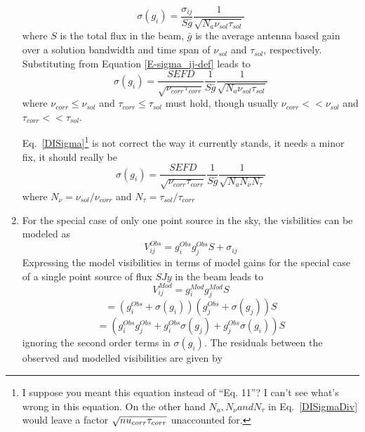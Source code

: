 \documentclass[11pt]{article}
\begin{document}
\begin{enumerate}
\begin{equation}
\sigma(g_i) = \frac {\sigma_{ij}} {S \bar{g}} \frac {1} {\sqrt{N_a \nu_{sol} \tau_{sol}}}
\end{equation}
where $S$ is the total flux in the beam, $\bar{g}$ is the average antenna based gain over a solution bandwidth and time span of $\nu_{sol}$ and $\tau_{sol}$, respectively.
Substituting from Equation \ref{E-sigma_ij-def} leads to
\begin{equation}
\sigma(g_i) = \frac {SEFD} {\sqrt{\nu_{corr} \tau_{corr}}} \frac {1} {S \bar{g}} \frac {1} {\sqrt{N_a \nu_{sol} \tau_{sol}}}
\end{equation}
where $\nu_{corr} \le \nu_{sol}$ and $\tau_{corr} \le \tau_{sol}$ must hold, though usually $\nu_{corr} << \nu_{sol}$ and $\tau_{corr} << \tau_{sol}$.

Eq.~\ref{DISigma}\footnote{I suppose you meant this equation instead
  of ``Eq. 11''?  I can't see what's wrong in this equation.  On the
  other hand $N_a, N_\nu and N_\tau$ in Eq.~\ref{DISigmaDiv} would
  leave a factor $\sqrt{\\nu_{corr}\tau_{corr}}$ unaccounted for.} is not correct the way it currently stands, it needs a minor fix, it should really be
\begin{equation}
\label{DISigmaDiv}
\sigma(g_i) = \frac {SEFD} {\sqrt{\nu_{corr} \tau_{corr}}} \frac {1} {S \bar{g}} \frac {1} {\sqrt{N_a N_{\nu} N_{\tau}}}
\end{equation}
where $N_{\nu} = \nu_{sol}/\nu_{corr}$ and $N_{\tau} = \tau_{sol}/\tau_{corr}$ 
\item 
For the special case of only one point source in the sky, the visbilities can be modeled as
\begin{equation}
V_{ij}^{Obs} = g_i^{Obs} g_j^{Obs} S + \sigma_{ij}
\end{equation}
Expressing the model visibilities in terms of model gains for the special case of a single point source of flux $S Jy$ in the beam leads to
\begin{equation}
V_{ij}^{Mod} = g_i^{Mod} g_j^{Mod} S 
\end{equation}
\begin{equation}
= (g_i^{Obs} + \sigma(g_i)) (g_j^{Obs} + \sigma(g_j)) S
\end{equation}
\begin{equation}
= (g_i^{Obs} g_j^{Obs} + g_i^{Obs} \sigma(g_j) +  g_j^{Obs} \sigma(g_i)) S
\end{equation}
ignoring the second order terms in $\sigma(g_i)$.
The residuals between the observed and modelled visibilities are given by

\end{enumerate}
\end{document}
